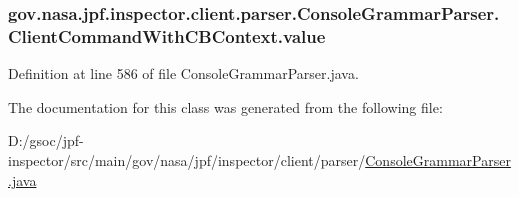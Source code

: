 \subsubsection[{\texorpdfstring{value}{value}}]{ gov.\+nasa.\+jpf.\+inspector.\+client.\+parser.\+Console\+Grammar\+Parser.\+Client\+Command\+With\+C\+B\+Context.\+value}\hypertarget{classgov_1_1nasa_1_1jpf_1_1inspector_1_1client_1_1parser_1_1_console_grammar_parser_1_1_client_command_with_c_b_context_a8c91d28b0afd2c745beca164647c98a8}{}\label{classgov_1_1nasa_1_1jpf_1_1inspector_1_1client_1_1parser_1_1_console_grammar_parser_1_1_client_command_with_c_b_context_a8c91d28b0afd2c745beca164647c98a8}


Definition at line 586 of file Console\+Grammar\+Parser.\+java.



The documentation for this class was generated from the following file\+:\begin{DoxyCompactItemize}
\item 
D\+:/gsoc/jpf-\/inspector/src/main/gov/nasa/jpf/inspector/client/parser/\hyperlink{_console_grammar_parser_8java}{Console\+Grammar\+Parser.\+java}\end{DoxyCompactItemize}
